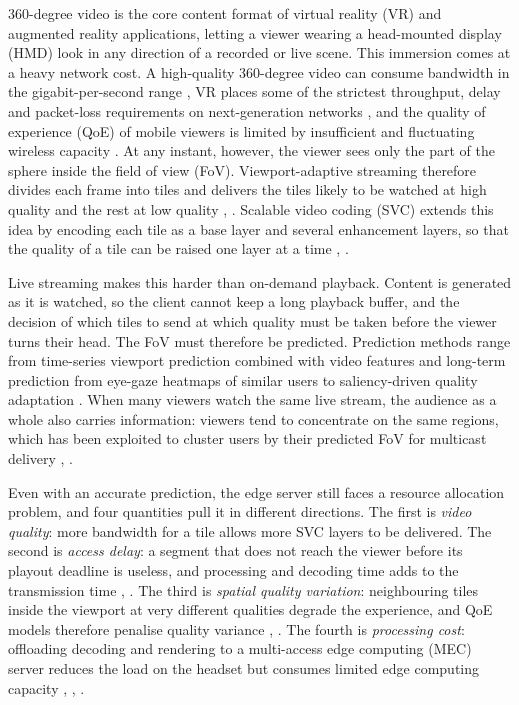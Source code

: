 \documentclass[conference]{IEEEtran}
\begin{document}
360-degree video is the core content format of virtual reality (VR) and augmented reality applications, letting a viewer wearing a head-mounted display (HMD) look in any direction of a recorded or live scene. This immersion comes at a heavy network cost. A high-quality 360-degree video can consume bandwidth in the gigabit-per-second range \cite{b1}, VR places some of the strictest throughput, delay and packet-loss requirements on next-generation networks \cite{b3}, and the quality of experience (QoE) of mobile viewers is limited by insufficient and fluctuating wireless capacity \cite{b10}. At any instant, however, the viewer sees only the part of the sphere inside the field of view (FoV). Viewport-adaptive streaming therefore divides each frame into tiles and delivers the tiles likely to be watched at high quality and the rest at low quality \cite{b5}, \cite{b10}. Scalable video coding (SVC) extends this idea by encoding each tile as a base layer and several enhancement layers, so that the quality of a tile can be raised one layer at a time \cite{b2}, \cite{b9}.

Live streaming makes this harder than on-demand playback. Content is generated as it is watched, so the client cannot keep a long playback buffer, and the decision of which tiles to send at which quality must be taken before the viewer turns their head. The FoV must therefore be predicted. Prediction methods range from time-series viewport prediction combined with video features \cite{b5} and long-term prediction from eye-gaze heatmaps of similar users \cite{b1} to saliency-driven quality adaptation \cite{b10}. When many viewers watch the same live stream, the audience as a whole also carries information: viewers tend to concentrate on the same regions, which has been exploited to cluster users by their predicted FoV for multicast delivery \cite{b11}, \cite{b12}.

Even with an accurate prediction, the edge server still faces a resource allocation problem, and four quantities pull it in different directions. The first is \emph{video quality}: more bandwidth for a tile allows more SVC layers to be delivered. The second is \emph{access delay}: a segment that does not reach the viewer before its playout deadline is useless, and processing and decoding time adds to the transmission time \cite{b4}, \cite{b8}. The third is \emph{spatial quality variation}: neighbouring tiles inside the viewport at very different qualities degrade the experience, and QoE models therefore penalise quality variance \cite{b4}, \cite{b8}. The fourth is \emph{processing cost}: offloading decoding and rendering to a multi-access edge computing (MEC) server reduces the load on the headset but consumes limited edge computing capacity \cite{b4}, \cite{b7}, \cite{b9}.
\end{document}
